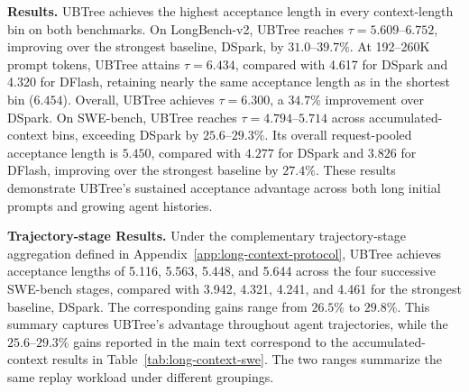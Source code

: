 \begin{table}[!t]
\centering
\caption{Acceptance length ($\tau$) on SWE-bench with Ling3-Flash, grouped by accumulated prompt tokens relative to the first request in each case. Covered cases gives the number of cases represented in each bin. The Overall column reports request-pooled acceptance length over all 1,482 requests from 30 cases. Bold marks the best acceptance length per column.}
\label{tab:long-context-swe}
\begingroup
\small
\setlength{\tabcolsep}{4pt}
\renewcommand{\arraystretch}{0.95}
\endgroup
\end{table}

\noindent\textbf{Results.}
UBTree achieves the highest acceptance length in every context-length bin on both benchmarks. On LongBench-v2, UBTree reaches $\tau=5.609$--$6.752$, improving over the strongest baseline, DSpark, by $31.0$--$39.7\%$. At 192--260K prompt tokens, UBTree attains $\tau=6.434$, compared with 4.617 for DSpark and 4.320 for DFlash, retaining nearly the same acceptance length as in the shortest bin ($6.454$). Overall, UBTree achieves $\tau=6.300$, a $34.7\%$ improvement over DSpark. On SWE-bench, UBTree reaches $\tau=4.794$--$5.714$ across accumulated-context bins, exceeding DSpark by $25.6$--$29.3\%$. Its overall request-pooled acceptance length is $5.450$, compared with $4.277$ for DSpark and $3.826$ for DFlash, improving over the strongest baseline by $27.4\%$. These results demonstrate UBTree's sustained acceptance advantage across both long initial prompts and growing agent histories.

\noindent\textbf{Trajectory-stage Results.}
Under the complementary trajectory-stage aggregation defined in Appendix~\ref{app:long-context-protocol}, UBTree achieves acceptance lengths of 5.116, 5.563, 5.448, and 5.644 across the four successive SWE-bench stages, compared with 3.942, 4.321, 4.241, and 4.461 for the strongest baseline, DSpark. The corresponding gains range from $26.5\%$ to $29.8\%$. This summary captures UBTree's advantage throughout agent trajectories, while the $25.6$--$29.3\%$ gains reported in the main text correspond to the accumulated-context results in Table~\ref{tab:long-context-swe}. The two ranges summarize the same replay workload under different groupings.

\FloatBarrier
